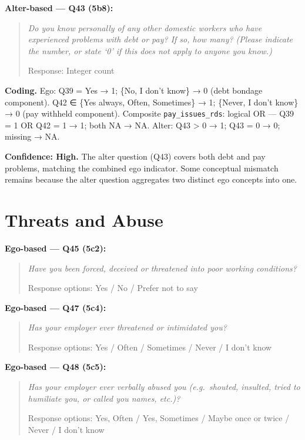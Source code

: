 \documentclass[
  12pt,
  letterpaper,
  DIV=11,
  numbers=noendperiod]{scrreprt}
\begin{document}
\textbf{Alter-based --- Q43 (5b8):}

\begin{quote}
\emph{Do you know personally of any other domestic workers who have
experienced problems with debt or pay? If so, how many? (Please indicate
the number, or state `0' if this does not apply to anyone you know.)}

Response: Integer count
\end{quote}

\textbf{Coding.} Ego: Q39 = Yes → 1; \{No, I don't know\} → 0 (debt
bondage component). Q42 ∈ \{Yes always, Often, Sometimes\} → 1; \{Never,
I don't know\} → 0 (pay withheld component). Composite
\texttt{pay\_issues\_rds}: logical OR --- Q39 = 1 OR Q42 = 1 → 1; both
NA → NA. Alter: Q43 \textgreater{} 0 → 1; Q43 = 0 → 0; missing → NA.

\textbf{Confidence: High.} The alter question (Q43) covers both debt and
pay problems, matching the combined ego indicator. Some conceptual
mismatch remains because the alter question aggregates two distinct ego
concepts into one.

\section{Threats and Abuse}\label{sec-b-threats}

\textbf{Ego-based --- Q45 (5c2):}

\begin{quote}
\emph{Have you been forced, deceived or threatened into poor working
conditions?}

Response options: Yes / No / Prefer not to say
\end{quote}

\textbf{Ego-based --- Q47 (5c4):}

\begin{quote}
\emph{Has your employer ever threatened or intimidated you?}

Response options: Yes / Often / Sometimes / Never / I don't know
\end{quote}

\textbf{Ego-based --- Q48 (5c5):}

\begin{quote}
\emph{Has your employer ever verbally abused you (e.g.~shouted,
insulted, tried to humiliate you, or called you names, etc.)?}

Response options: Yes, Often / Yes, Sometimes / Maybe once or twice /
Never / I don't know
\end{quote}
\end{document}
